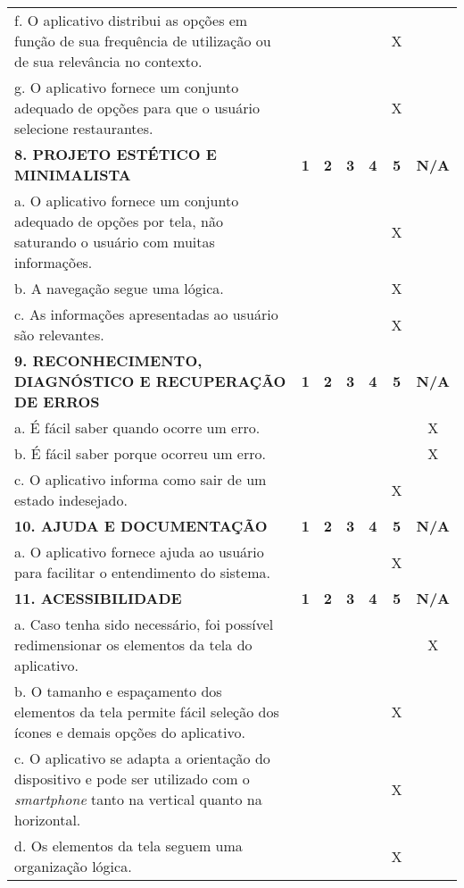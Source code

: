 \documentclass[portuguese,oneside]{tcc}
\begin{document}
\begin{center}
\begin{longtabu}{|L{25em}|c|c|c|c|c|c|}
f. O aplicativo distribui as opções em função de sua frequência de utilização ou de sua relevância no contexto.	& & & & & X & \\ 
g. O aplicativo fornece um conjunto adequado de opções para que o usuário selecione restaurantes. & & & & & X & \\ 
\textbf{8. PROJETO ESTÉTICO E MINIMALISTA} & \textbf{1} & \textbf{2} & \textbf{3} & \textbf{4} & \textbf{5} & \textbf{N/A} \\ 
a. O aplicativo fornece um conjunto adequado de opções por tela, não saturando o usuário com muitas informações. & & & & & X & \\ 
b. A navegação segue uma lógica. & & & & & X & \\ 
c. As informações apresentadas ao usuário são relevantes. & & & & & X & \\ 
\textbf{9. RECONHECIMENTO, DIAGNÓSTICO E RECUPERAÇÃO DE ERROS} & \textbf{1} & \textbf{2} & \textbf{3} & \textbf{4} & \textbf{5} & \textbf{N/A} \\ 
a. É fácil saber quando ocorre um erro.	& & & & & & X \\ 
b. É fácil saber porque ocorreu um erro. & & & & & & X \\ 
c. O aplicativo informa como sair de um estado indesejado. & & & & & X & \\ 
\textbf{10. AJUDA E DOCUMENTAÇÃO} & \textbf{1} & \textbf{2} & \textbf{3} & \textbf{4} & \textbf{5} & \textbf{N/A} \\ 
a. O aplicativo fornece ajuda ao usuário para facilitar o entendimento do sistema. & & & & & X & \\ 
\textbf{11. ACESSIBILIDADE} & \textbf{1} & \textbf{2} & \textbf{3} & \textbf{4} & \textbf{5} & \textbf{N/A} \\ 
a. Caso tenha sido necessário, foi possível redimensionar os elementos da tela do aplicativo. & & & & & & X \\ 
b. O tamanho e espaçamento dos elementos da tela permite fácil seleção dos ícones e demais opções do aplicativo. & & & & & X & \\ 
c. O aplicativo se adapta a orientação do dispositivo e pode ser utilizado com o \emph{smartphone} tanto na vertical quanto na horizontal. & & & & & X & \\ 
d. Os elementos da tela seguem uma organização lógica. & & & & & X & \\ 

\end{longtabu}
\end{center}
\end{document}
